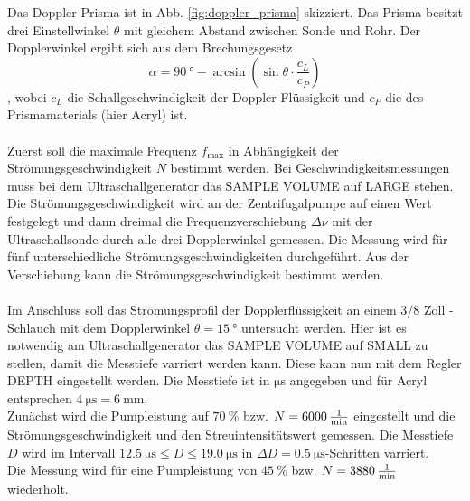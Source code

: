 Das Doppler-Prisma ist in Abb. \ref{fig:doppler_prisma} skizziert.
Das Prisma besitzt drei Einstellwinkel $\theta$ mit gleichem Abstand zwischen Sonde und Rohr.
Der Dopplerwinkel ergibt sich aus dem Brechungsgesetz
\begin{equation}
    \alpha = \SI{90}{\degree} - \arcsin \left( \sin \theta \cdot \frac{c_L}{c_P} \right)
    \label{eqn:dopplerwinkel}
\end{equation}
, wobei $c_L$ die Schallgeschwindigkeit der Doppler-Flüssigkeit und $c_P$ die des Prismamaterials (hier Acryl) ist.
\\
\\
Zuerst soll die maximale Frequenz $f_\text{max}$ in Abhängigkeit der Strömungsgeschwindigkeit $N$ bestimmt werden.
Bei Geschwindigkeitsmessungen muss bei dem Ultraschallgenerator das SAMPLE VOLUME auf LARGE stehen.
Die Strömungsgeschwindigkeit wird an der Zentrifugalpumpe auf einen Wert festgelegt und dann dreimal die Frequenzverschiebung $\Delta \nu$ mit der Ultraschallsonde durch alle drei Dopplerwinkel gemessen.
Die Messung wird für fünf unterschiedliche Strömungsgeschwindigkeiten durchgeführt.
Aus der Verschiebung kann die Strömungsgeschwindigkeit bestimmt werden.
\\
\\
Im Anschluss soll das Strömungsprofil der Dopplerflüssigkeit an einem 3/8 Zoll -Schlauch mit dem Dopplerwinkel $\theta = \SI{15}{\degree}$ untersucht werden.
Hier ist es notwendig am Ultraschallgenerator das SAMPLE VOLUME auf SMALL zu stellen, damit die Messtiefe varriert werden kann.
Diese kann nun mit dem Regler DEPTH eingestellt werden.
Die Messtiefe ist in $\si{\micro\second}$ angegeben und für Acryl entsprechen $\SI{4}{\micro\second} = \SI{6}{\milli\metre}$.\\
Zunächst wird die Pumpleistung auf $\SI{70}{\percent}$ bzw. $N = \SI{6000}{\frac{1}{\minute}}$ eingestellt und die Strömungsgeschwindigkeit und den Streuintensitätswert gemessen.
Die Messtiefe $D$ wird im Intervall $\SI{12.5}{\micro\second} \leq D \leq \SI{19.0}{\micro\second}$ in $\Delta D = \SI{0.5}{\micro\second}$-Schritten varriert.\\
Die Messung wird für eine Pumpleistung von $\SI{45}{\percent}$ bzw. $N = \SI{3880}{\frac{1}{\minute}}$ wiederholt.